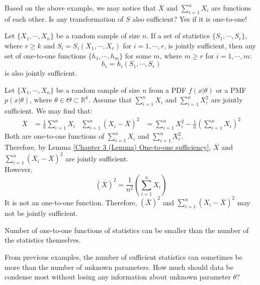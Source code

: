 \documentclass{huhtakm-template-book-v2}
\begin{document}
\newpage
Based on the above example, we may notice that $\overline{X}$ and $\sum_{i=1}^{n}X_{i}$ are functions of each other. Is any transformation of $S$ also sufficient? Yes if it is one-to-one!
\begin{lem}
	\label{Chapter 3 (Lemma) One-to-one sufficiency}
	Let $\{X_{1},\cdots,X_{n}\}$ be a random sample of size $n$. If a set of statistics $\{S_{1},\cdots,S_{r}\}$, where $r\geq k$ and $S_{i}=S_{i}(X_{1},\cdots,X_{r})$ for $i=1,\cdots,r$, is jointly sufficient, then any set of one-to-one functions $\{h_{1},\cdots,h_{m}\}$ for some $m$, where $m\geq r$ for $i=1,\cdots,m$:
	\begin{equation*}
		h_{i}=h_{i}(S_{1},\cdots,S_{r})
	\end{equation*}
	is also jointly sufficient.
\end{lem}
\begin{eg}
	Let $\{X_{1},\cdots,X_{n}\}$ be a random sample of size $n$ from a PDF $f(x|\theta)$ or a PMF $p(x|\theta)$, where $\theta\in\Theta\subset\mathbb{R}^{k}$. Assume that $\sum_{i=1}^{n}X_{i}$ and $\sum_{i=1}^{n}X_{i}^{2}$ are jointly sufficient. We may find that:
	\begin{align*}
		\overline{X}&=\frac{1}{n}\sum_{i=1}^{n}X_{i} & \sum_{i=1}^{n}(X_{i}-\overline{X})^{2}&=\sum_{i=1}^{n}X_{i}^{2}-\frac{1}{n}\left(\sum_{i=1}^{n}X_{i}\right)^{2}
	\end{align*}
	Both are one-to-one functions of $\sum_{i=1}^{n}X_{i}$ and $\sum_{i=1}^{n}X_{i}^{2}$.\\
	Therefore, by Lemma \ref{Chapter 3 (Lemma) One-to-one sufficiency}, $\overline{X}$ and $\sum_{i=1}^{n}(X_{i}-\overline{X})^{2}$ are jointly sufficient.\\
	However,
	\begin{equation*}
		(\overline{X})^{2}=\frac{1}{n^{2}}\left(\sum_{i=1}^{n}X_{i}\right)
	\end{equation*}
	It is not an one-to-one function. Therefore, $(\overline{X})^{2}$ and $\sum_{i=1}^{n}(X_{i}-\overline{X})^{2}$ may not be jointly sufficient.
\end{eg}
\begin{rem}
	Number of one-to-one functions of statistics can be smaller than the number of the statistics themselves.
\end{rem}
From previous examples, the number of sufficient statistics can sometimes be more than the number of unknown parameters. How much should data be condense most without losing any information about unknown parameter $\theta$?
\end{document}
